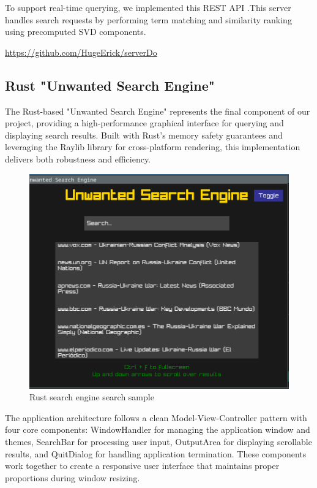 \documentclass[twoside]{article}
\begin{document}
To support real-time querying, we implemented this REST API .This server handles search requests by performing term matching and similarity ranking using precomputed SVD components.

\url{https://github.com/HugeErick/serverDo}


\subsection{Rust "Unwanted Search Engine"}
The Rust-based "Unwanted Search Engine" represents the final component of our project, providing a high-performance graphical interface for querying and displaying search results. Built with Rust's memory safety guarantees and leveraging the Raylib library for cross-platform rendering, this implementation delivers both robustness and efficiency.

\begin{figure}[H]
  \centering
  \includegraphics[width=1\textwidth]{imgs/search.png}
  \caption{Rust search engine search sample}
  \label{fig:7}
\end{figure}

The application architecture follows a clean Model-View-Controller pattern with four core components: WindowHandler for managing the application window and themes, SearchBar for processing user input, OutputArea for displaying scrollable results, and QuitDialog for handling application termination. These components work together to create a responsive user interface that maintains proper proportions during window resizing.
\end{document}
